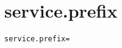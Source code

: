 \section{service.prefix}
\label{configuration:ServicePrefix}
\ClearAPI
\TODO
\begin{lstlisting}[style=Props,caption={Usage example for \textit{service.prefix}}]
service.prefix=
\end{lstlisting}